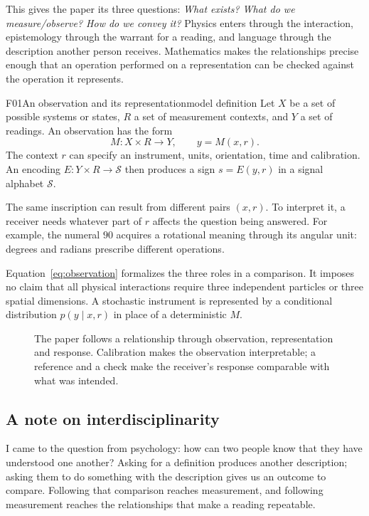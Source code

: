 \documentclass[11pt,a4paper]{article}
\begin{document}
This gives the paper its three questions: \emph{What exists? What do we
measure/observe? How do we convey it?} Physics enters through the interaction,
epistemology through the warrant for a reading, and language through the
description another person receives. Mathematics makes the relationships precise
enough that an operation performed on a representation can be checked against
the operation it represents.

\begin{formal}{F01}{An observation and its representation}{model definition}
Let $X$ be a set of possible systems or states, $R$ a set of measurement
contexts, and $Y$ a set of readings. An observation has the form
\begin{equation}\label{eq:observation}
 M:X\times R\longrightarrow Y,\qquad y=M(x,r).
\end{equation}
The context $r$ can specify an instrument, units, orientation, time and
calibration. An encoding $E:Y\times R\to\mathcal S$ then produces a sign
$s=E(y,r)$ in a signal alphabet $\mathcal S$.

The same inscription can result from different pairs $(x,r)$. To interpret it,
a receiver needs whatever part of $r$ affects the question being answered. For
example, the numeral $90$ acquires a rotational meaning through its angular
unit: degrees and radians prescribe different operations.

Equation~\eqref{eq:observation} formalizes the three roles in a comparison.
It imposes no claim that all physical interactions require three independent
particles or three spatial dimensions. A stochastic instrument is represented
by a conditional distribution $p(y\mid x,r)$ in place of a deterministic $M$.
\end{formal}

\begin{figure}[htbp]
\centering

\caption{The paper follows a relationship through observation, representation
and response. Calibration makes the observation interpretable; a reference and
a check make the receiver's response comparable with what was intended.}
\label{fig:chain}
\end{figure}

\subsection{A note on interdisciplinarity}
I came to the question from psychology: how can two people know that they have
understood one another? Asking for a definition produces another description;
asking them to do something with the description gives us an outcome to compare.
Following that comparison reaches measurement, and following measurement reaches
the relationships that make a reading repeatable.
\end{document}
